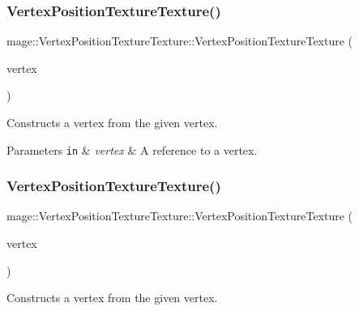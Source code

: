 \subsubsection{\texorpdfstring{Vertex\+Position\+Texture\+Texture()}{VertexPositionTextureTexture()}\hspace{0.1cm}{\footnotesize\ttfamily [3/4]}}
{\footnotesize\ttfamily mage\+::\+Vertex\+Position\+Texture\+Texture\+::\+Vertex\+Position\+Texture\+Texture (\begin{DoxyParamCaption}\item[{const \hyperlink{structmage_1_1_vertex_position_texture_texture}{Vertex\+Position\+Texture\+Texture} \&}]{vertex }\end{DoxyParamCaption})\hspace{0.3cm}{\ttfamily [default]}}

Constructs a vertex from the given vertex.


\begin{DoxyParams}[1]{Parameters}
\mbox{\tt in}  & {\em vertex} & A reference to a vertex. \\
\hline
\end{DoxyParams}
\hypertarget{structmage_1_1_vertex_position_texture_texture_abd23d266932ec6f8c830b804a25a1fe5}{}\label{structmage_1_1_vertex_position_texture_texture_abd23d266932ec6f8c830b804a25a1fe5} 
\subsubsection{\texorpdfstring{Vertex\+Position\+Texture\+Texture()}{VertexPositionTextureTexture()}\hspace{0.1cm}{\footnotesize\ttfamily [4/4]}}
{\footnotesize\ttfamily mage\+::\+Vertex\+Position\+Texture\+Texture\+::\+Vertex\+Position\+Texture\+Texture (\begin{DoxyParamCaption}\item[{\hyperlink{structmage_1_1_vertex_position_texture_texture}{Vertex\+Position\+Texture\+Texture} \&\&}]{vertex }\end{DoxyParamCaption})\hspace{0.3cm}{\ttfamily [default]}}

Constructs a vertex from the given vertex.


